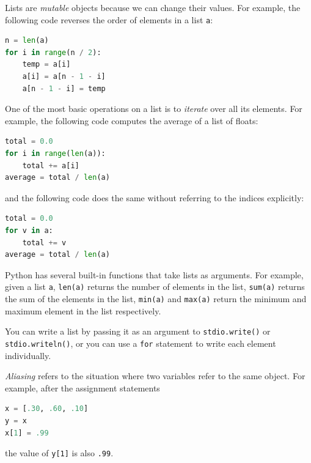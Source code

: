 \documentclass[8pt,a4paper,compress,handout]{beamer}
\begin{document}
\begin{frame}[fragile]
Lists are \emph{mutable} objects because we can change their values. For example, the following code reverses the order of elements in a list \lstinline{a}:

\begin{lstlisting}[language=Python]
n = len(a)
for i in range(n / 2):
    temp = a[i]
    a[i] = a[n - 1 - i]
    a[n - 1 - i] = temp
\end{lstlisting}

\bigskip

One of the most basic operations on a list is to \emph{iterate} over all its elements. For example, the following code computes the average of a list of floats:

\begin{lstlisting}[language=Python]
total = 0.0
for i in range(len(a)):
    total += a[i]
average = total / len(a)
\end{lstlisting}

and the following code does the same without referring to the indices explicitly:

\begin{lstlisting}[language=Python]
total = 0.0
for v in a:
    total += v
average = total / len(a)
\end{lstlisting}
\end{frame}

\begin{frame}[fragile]
Python has several built-in functions that take lists as arguments. For example, given a list \lstinline{a}, \lstinline{len(a)} returns the number of elements in the list, \lstinline{sum(a)} returns the sum of the elements in the list, \lstinline{min(a)} and \lstinline{max(a)} return the minimum and maximum element in the list respectively.

\bigskip

You can write a list by passing it as an argument to \lstinline{stdio.write()} or \lstinline{stdio.writeln()}, or you can use a \lstinline{for} statement to write each element individually.

\bigskip

\emph{Aliasing} refers to the situation where two variables refer to the same object. For example, after the assignment statements
\begin{lstlisting}[language=Python]
x = [.30, .60, .10]
y = x
x[1] = .99
\end{lstlisting}
the value of \lstinline{y[1]} is also \lstinline{.99}.
\end{frame}
\end{document}
